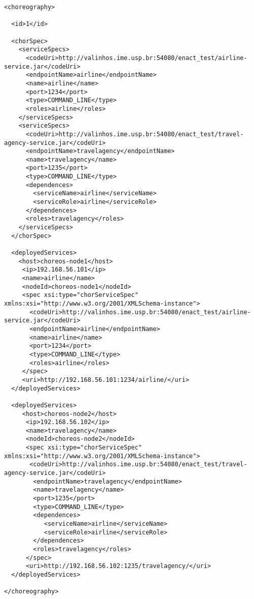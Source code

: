 {\footnotesize
\begin{lstlisting}[frame=trbl, label=lst:chor_xml, caption=Exemplo de representação XML da classe \textsf{Choreography}]
<choreography>

  <id>1</id>

  <chorSpec>
    <serviceSpecs>
      <codeUri>http://valinhos.ime.usp.br:54080/enact_test/airline-service.jar</codeUri>
      <endpointName>airline</endpointName>
      <name>airline</name>
      <port>1234</port>
      <type>COMMAND_LINE</type>
      <roles>airline</roles>
    </serviceSpecs>
    <serviceSpecs>
      <codeUri>http://valinhos.ime.usp.br:54080/enact_test/travel-agency-service.jar</codeUri>
      <endpointName>travelagency</endpointName>
      <name>travelagency</name>
      <port>1235</port>
      <type>COMMAND_LINE</type>
      <dependences>
        <serviceName>airline</serviceName>
        <serviceRole>airline</serviceRole>
      </dependences>
      <roles>travelagency</roles>
    </serviceSpecs>
  </chorSpec>
  
  <deployedServices>
    <host>choreos-node1</host>
     <ip>192.168.56.101</ip>
     <name>airline</name>
     <nodeId>choreos-node1</nodeId>
     <spec xsi:type="chorServiceSpec" xmlns:xsi="http://www.w3.org/2001/XMLSchema-instance">
       <codeUri>http://valinhos.ime.usp.br:54080/enact_test/airline-service.jar</codeUri>
       <endpointName>airline</endpointName>
       <name>airline</name>
       <port>1234</port>
       <type>COMMAND_LINE</type>
       <roles>airline</roles>
     </spec>
     <uri>http://192.168.56.101:1234/airline/</uri>
  </deployedServices>
  
  <deployedServices>
     <host>choreos-node2</host>
      <ip>192.168.56.102</ip>
      <name>travelagency</name>
      <nodeId>choreos-node2</nodeId>
      <spec xsi:type="chorServiceSpec" xmlns:xsi="http://www.w3.org/2001/XMLSchema-instance">
       <codeUri>http://valinhos.ime.usp.br:54080/enact_test/travel-agency-service.jar</codeUri>
        <endpointName>travelagency</endpointName>
        <name>travelagency</name>
        <port>1235</port>
        <type>COMMAND_LINE</type>
        <dependences>
           <serviceName>airline</serviceName>
           <serviceRole>airline</serviceRole>
        </dependences>
        <roles>travelagency</roles>
      </spec>
      <uri>http://192.168.56.102:1235/travelagency/</uri>
  </deployedServices>

</choreography>

\end{lstlisting}

}


